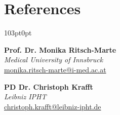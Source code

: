 \section{References}
\begin{adjustwidth}{103pt}{0pt}
\begin{minipage}[t]{0.45\textwidth}
\raggedright
\textbf{Prof. Dr. Monika Ritsch-Marte} \\
\textit{Medical University of Innsbruck} \\
\href{mailto:monika.ritsch-marte@i-med.ac.at}{monika.ritsch-marte@i-med.ac.at}
\end{minipage}
\hfill
\begin{minipage}[t]{0.45\textwidth}
\raggedright
\textbf{PD Dr. Christoph Krafft} \\
\textit{Leibniz IPHT} \\
\href{mailto:christoph.krafft@leibniz-ipht.de}{christoph.krafft@leibniz-ipht.de}
\end{minipage}
\end{adjustwidth}

